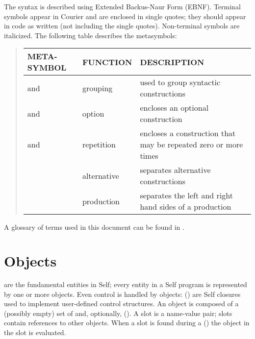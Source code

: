 \documentclass[letterpaper,10pt,english]{sphinxmanual}
\begin{document}
The syntax is described using Extended Backus-Naur Form (EBNF). Terminal symbols appear in
Courier and are enclosed in single quotes; they should appear in code as written (not including
the single quotes). Non-terminal symbols are italicized. The following table describes the metasymbols:
\begin{quote}

\noindent\begin{tabulary}{\linewidth}{|L|L|L|}
\hline

META-SYMBOL
&
FUNCTION
&
DESCRIPTION
\\
\hline
\sphinxcode{(} and \sphinxcode{)}
&
grouping
&
used to group syntactic constructions
\\
\hline
\sphinxcode{{[}} and \sphinxcode{{]}}
&
option
&
encloses an optional construction
\\
\hline
\sphinxcode{\{} and \sphinxcode{\}}
&
repetition
&
encloses a construction that may be repeated zero or more times
\\
\hline
\sphinxcode{\textbackslash{}}
&
alternative
&
separates alternative constructions
\\
\hline
\sphinxcode{\(\rightarrow\)}
&
production
&
separates the left and right hand sides of a production
\\
\hline\end{tabulary}

\end{quote}

A glossary of terms used in this document can be found in {\hyperref[\detokenize{glossary::doc}]{}}.


\section{Objects}
\label{\detokenize{langref:objects}}\label{\detokenize{langref:index-2}}
 are the fundamental entities in Self; every entity in a Self program is represented by one
or more objects. Even control is handled by objects:  ({\hyperref[\detokenize{langref:pp-langref-blocks}]{}}) are Self closures used to implement
user-defined control structures. An object is composed of a (possibly empty) set of 
and, optionally,  ({\hyperref[\detokenize{langref:pp-langref-code}]{}}). A slot is a name-value pair; slots contain references to other objects.
When a slot is found during a  ({\hyperref[\detokenize{langref:pp-langref-message-lookup}]{}}) the object in the slot is evaluated.
\end{document}
